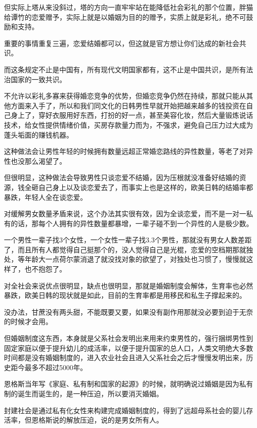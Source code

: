 \documentclass[UTF8,11pt,oneside]{ctexart}
\begin{document}
但实际上塔从来没斜过，塔的方向一直牢牢站在能降低社会彩礼的那个位置，胖猫给谭竹的恋爱赠予，实际上就是以婚姻为目的的赠予，实质上就是彩礼，绝不可鼓励和支持。

重要的事情重复三遍，恋爱结婚都可以，但这就是官方想让你们达成的新社会共识。


而这条规定不止是中国有，所有现代文明国家都有，这不止是中国共识，是所有法治国家的一致共识。

不允许以彩礼多寡来获得婚恋竞争的优势，但婚恋竞争仍然在持续，那就只能从其他方面来入手了，所以和我们同文化的日韩男性早就开始把越来越多的钱投资在自己身上了，穿好衣服用好东西，打扮的好一点，甚至美容化妆，然后大量锻炼说话技术，给女性提供情绪价值，买房存款量力而为，不强求，避免自己压力过大成为蓬头垢面的赚钱机器。

这种做法会让男性年轻的时候拥有数量远超正常婚恋路线的异性数量，等老了对异性也没那么渴望了。

但很明显，这种做法会导致男性只谈恋爱不结婚，因为压根就没准备好结婚的资源，钱全砸自己身上以及谈恋爱去了，而事实上也是这样的，欧美日韩的结婚率都暴跌，年轻人全在谈恋爱。

对缓解男女数量矛盾来说，这个办法其实很有效，因为全谈恋爱，而不是一对一私有的话，那每个人拥有的异性数量都暴增，一辈子碰不到一个异性的人是极少数。

一个男性一辈子找3个女性，一个女性一辈子找3.3个男性，那就没有男女人数差距了，而且所有人都觉得自己挺那个的，没人觉得自己是光棍，恋爱的空档期那就独处，等年龄大一点荷尔蒙消退了就没找对象的欲望了，对独处也习惯了，慢慢就这样了，也不抱怨了。

对全社会来说优点很明显，缺点也很明显，那就是婚姻制度会解体，生育率也必然暴跌，欧美日韩的现状就是如此，目前的生育率都是用移民和私生子撑起来的。

没办法，甘蔗没有两头甜，不能既要又要，如果没有副作用那就没必要到迫于无奈的时候才会用。

但婚姻制度这东西，本身就是父系社会发明出来用来约束男性的，强行捆绑男性到固定家庭以便于提升幼儿的成活率，以便于提升国家的总人口，人类文明绝大多数时间都是没有婚姻制度的，进入农业社会且进入父系社会之后才慢慢发明出来，历史距今最多不超过5000年。

恩格斯当年写《家庭、私有制和国家的起源》的时候，就明确说过婚姻是因为私有制的诞生而诞生的，是一种压迫，所以要消灭婚姻。

封建社会是通过私有化女性来构建完成婚姻制度的，得到了远超母系社会的婴儿存活率，但恩格斯说的解放压迫，说的是男女所有人。
\end{document}
